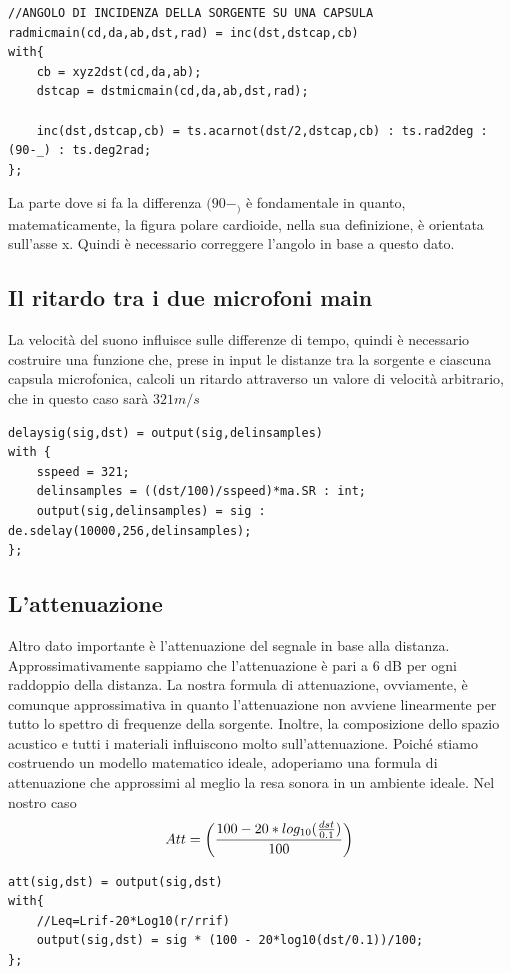 \documentclass{article}
\begin{document}
    \begin{lstlisting}
//ANGOLO DI INCIDENZA DELLA SORGENTE SU UNA CAPSULA
radmicmain(cd,da,ab,dst,rad) = inc(dst,dstcap,cb)
with{
    cb = xyz2dst(cd,da,ab);
    dstcap = dstmicmain(cd,da,ab,dst,rad);
    
    inc(dst,dstcap,cb) = ts.acarnot(dst/2,dstcap,cb) : ts.rad2deg : (90-_) : ts.deg2rad;
};
    \end{lstlisting}

    La parte dove si fa la differenza $(90-_)$ è fondamentale in quanto, matematicamente, la figura polare cardioide, nella sua definizione, è orientata sull'asse x. Quindi è necessario correggere l'angolo in base a questo dato.\\
\subsection{Il ritardo tra i due microfoni main}
    La velocità del suono influisce sulle differenze di tempo, quindi è necessario costruire una funzione che, prese in input le distanze tra la sorgente e ciascuna capsula microfonica, calcoli un ritardo attraverso un valore di velocità arbitrario, che in questo caso sarà $321 m/s$ %

    \begin{lstlisting}
delaysig(sig,dst) = output(sig,delinsamples)
with {
    sspeed = 321;
    delinsamples = ((dst/100)/sspeed)*ma.SR : int;
    output(sig,delinsamples) = sig : de.sdelay(10000,256,delinsamples);
};
    \end{lstlisting}
    
\subsection{L'attenuazione}
    Altro dato importante è l'attenuazione del segnale in base alla distanza. Approssimativamente sappiamo che l'attenuazione è pari a 6 dB per ogni raddoppio della distanza. La nostra formula di attenuazione, ovviamente, è comunque approssimativa in quanto l'attenuazione non avviene linearmente per tutto lo spettro di frequenze della sorgente. Inoltre, la composizione dello spazio acustico e tutti i materiali influiscono molto sull'attenuazione. Poiché stiamo costruendo un modello matematico ideale, adoperiamo una formula di attenuazione che approssimi al meglio la resa sonora in un ambiente ideale. Nel nostro caso\\
    $$Att = \biggl({100 - 20*log_{10}(\frac{dst}{0.1})\over100} \biggr)$$
\begin{lstlisting}
att(sig,dst) = output(sig,dst)
with{
    //Leq=Lrif-20*Log10(r/rrif)
    output(sig,dst) = sig * (100 - 20*log10(dst/0.1))/100;
};
\end{lstlisting}
\end{document}
